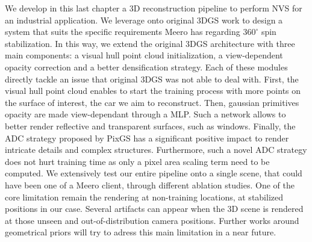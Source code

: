We develop in this last chapter a 3D reconstruction pipeline to perform \ac{NVS} for an industrial application. We leverage onto original 3D\ac{GS} \citep{kerbl20233d} work to design a system that suits the specific requirements Meero has regarding $360^{\circ}$ spin stabilization. In this way, we extend the original 3D\ac{GS} architecture with three main components: a visual hull point cloud initialization, a view-dependent opacity correction and a better densification strategy. Each of these modules directly tackle an issue that original 3D\ac{GS} was not able to deal with. First, the visual hull point cloud enables to start the training process with more points on the surface of interest, \ie the car we aim to reconstruct. Then, gaussian primitives opacity are made view-dependant through a \ac{MLP}. Such a network allows to better render reflective and transparent surfaces, such as windows. Finally, the \ac{ADC} strategy proposed by PixGS \citep{zhang2024pixel} has a significant positive impact to render intricate details and complex structures. Furthermore, such a novel \ac{ADC} strategy does not hurt training time as only a pixel area scaling term need to be computed. We extensively test our entire pipeline onto a single scene, that could have been one of a Meero client, through different ablation studies. One of the core limitation remain the rendering at non-training locations, \ie at stabilized positions in our case. Several artifacts can appear when the 3D scene is rendered at those unseen and out-of-distribution camera positions. Further works around geometrical priors will try to adress this main limitation in a near future. 
